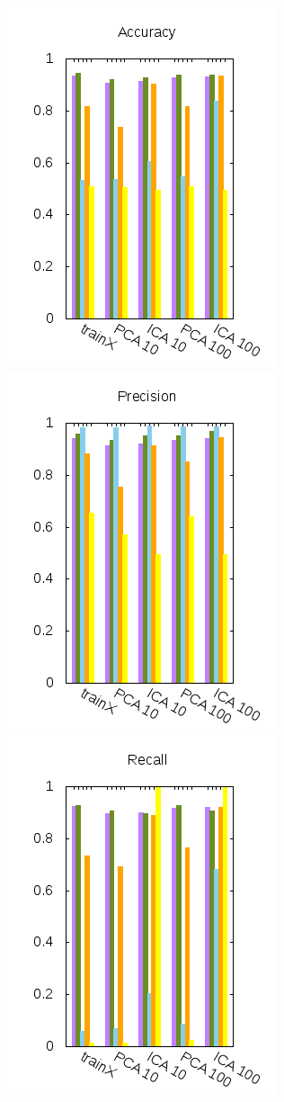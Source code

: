 \documentclass[10pt, a4paper]{article}
\begin{document}
\begin{figure}[H]
  \begin{minipage}{1\textwidth}
	\includegraphics[scale=0.5]{../src/data/vac.png}
	\includegraphics[scale=0.5]{../src/data/vpr.png}
	\includegraphics[scale=0.5]{../src/data/vre.png}

\end{minipage}
\end{figure}
\end{document}
